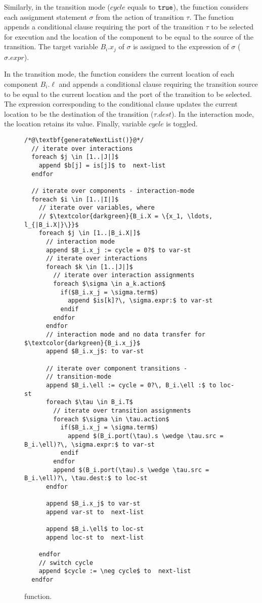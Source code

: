 \begin{enumerate}
Similarly, in the transition mode ($\mathit{cycle}$ equals to $\mathtt{true}$), the function considers each assignment statement $\sigma$ from the action of transition $\tau$. The function appends a conditional clause requiring the port of the transition $\tau$ to be selected for execution and the location of the component to be equal to the source of the transition. The target variable $B_i.x_j$ of $\sigma$ is assigned to the expression of $\sigma$ ($\sigma.expr$). 

In the transition mode, the function considers the current location of each component $B_i.\ell$ and appends a conditional clause requiring the transition source to be equal to the current location and the port of the transition to be selected. The expression corresponding to the conditional clause updates the current location to be the destination of the transition ($\tau.dest$).  In the interaction mode, the location retains its value.
Finally, variable $\mathit{cycle}$ is toggled. 

\begin{figure}
\begin{lstlisting}
/*@\textbf{generateNextList()}@*/ 
  // iterate over interactions
  foreach $j \in [1..|J|]$ 
    append $b[j] = is[j]$ to  next-list 
  endfor

  // iterate over components - interaction-mode
  foreach $i \in [1..|I|]$ 
    // iterate over variables, where 
    // $\textcolor{darkgreen}{B_i.X = \{x_1, \ldots, l_{|B_i.X|}\}}$ 
    foreach $j \in [1..|B_i.X|]$ 
      // interaction mode
      append $B_i.x_j := cycle = 0?$ to var-st
      // iterate over interactions
      foreach $k \in [1..|J|]$ 
        // iterate over interaction assignments
        foreach $\sigma \in a_k.action$
          if($B_i.x_j = \sigma.term$)
            append $is[k]?\, \sigma.expr:$ to var-st
          endif
        endfor
      endfor
      // interaction mode and no data transfer for $\textcolor{darkgreen}{B_i.x_j}$
      append $B_i.x_j$: to var-st 
      
      // iterate over component transitions - 
      // transition-mode
      append $B_i.\ell := cycle = 0?\, B_i.\ell :$ to loc-st
      foreach $\tau \in B_i.T$ 
        // iterate over transition assignments
        foreach $\sigma \in \tau.action$
          if($B_i.x_j = \sigma.term$)
            append $(B_i.port(\tau).s \wedge \tau.src = B_i.\ell)?\, \sigma.expr:$ to var-st 
          endif
        endfor
        append $(B_i.port(\tau).s \wedge \tau.src = B_i.\ell)?\, \tau.dest:$ to loc-st 
      endfor  
      
      append $B_i.x_j$ to var-st 
      append var-st to  next-list 
      
      append $B_i.\ell$ to loc-st 
      append loc-st to  next-list 

    endfor
    // switch cycle
    append $cycle := \neg cycle$ to  next-list 
  endfor
\end{lstlisting}
\caption{ function.}
\label{fig:generate-next-list}
\end{figure}
%
\end{enumerate}
